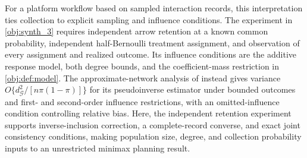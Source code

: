For a platform workflow based on sampled interaction records, this interpretation ties collection to explicit sampling and influence conditions. The experiment in \cref{obj:synth_3} requires independent arrow retention at a known common probability, independent half-Bernoulli treatment assignment, and observation of every assignment and realized outcome. Its influence conditions are the additive response model, both degree bounds, and the coefficient-mass restriction in \cref{obj:def:model}. The approximate-network analysis of \citet[Assumptions 1--3; Theorems 1--2; Lemma 2]{JiangDengWangWang2024ApproximateNetworks} instead gives variance \(O\{d_{\mathcal G}^2/[n\pi(1-\pi)]\}\) for its pseudoinverse estimator under bounded outcomes and first- and second-order influence restrictions, with an omitted-influence condition controlling relative bias. Here, the independent retention experiment supports inverse-inclusion correction, a complete-record converse, and exact joint consistency conditions, making population size, degree, and collection probability inputs to an unrestricted minimax planning result.
